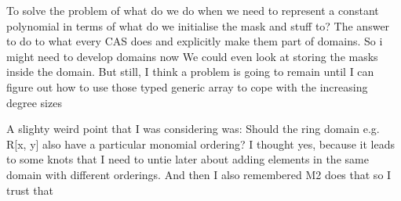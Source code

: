  To solve the problem of what do we do when we need to represent a constant polynomial in terms of what do we initialise the mask and stuff to? The answer to do to what every CAS does and explicitly make them part of domains. So i might need to develop domains now
We could even look at storing the masks inside the domain.
But still, I think a problem is going to remain until I can figure out how to use those typed generic array to cope with the increasing degree sizes

A slighty weird point that I was considering was: Should the ring domain e.g. R[x, y] also have a particular monomial ordering? I thought yes, because it leads to some knots that I need to untie later about adding elements in the same domain with different orderings. And then I also remembered M2 does that so I trust that

